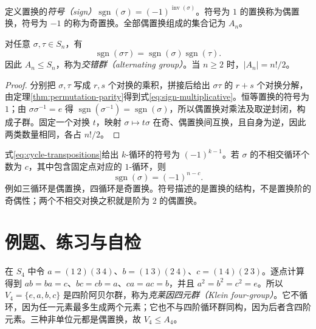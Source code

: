 \begin{definition}[符号与交错群]
定义置换的\emph{符号（sign）}$\operatorname{sgn}(\sigma)=(-1)^{\operatorname{inv}(\sigma)}$。符号为 $1$ 的置换称为偶置换，符号为 $-1$ 的称为奇置换。全部偶置换组成的集合记为 $A_n$。
\end{definition}

\begin{proposition}[符号的乘法性]\label{prop:sign-multiplicative}
对任意 $\sigma,\tau\in S_n$，有
\begin{equation}\label{eq:sign-multiplicative}
  \operatorname{sgn}(\sigma\tau)
  =\operatorname{sgn}(\sigma)\operatorname{sgn}(\tau).
\end{equation}
因此 $A_n\leq S_n$，称为\emph{交错群（alternating group）}。当 $n\geq2$ 时，$|A_n|=n!/2$。
\end{proposition}
\begin{proof}
分别把 $\sigma,\tau$ 写成 $r,s$ 个对换的乘积，拼接后给出 $\sigma\tau$ 的 $r+s$ 个对换分解，由定理\ref{thm:permutation-parity}得到式\eqref{eq:sign-multiplicative}。恒等置换的符号为 $1$；由 $\sigma\sigma^{-1}=e$ 得 $\operatorname{sgn}(\sigma^{-1})=\operatorname{sgn}(\sigma)$，所以偶置换对乘法及取逆封闭，构成子群。固定一个对换 $t$，映射 $\sigma\mapsto t\sigma$ 在奇、偶置换间互换，且自身为逆，因此两类数量相同，各占 $n!/2$。
\end{proof}

式\eqref{eq:cycle-transpositions}给出 $k$-循环的符号为 $(-1)^{k-1}$。若 $\sigma$ 的不相交循环个数为 $c$，其中包含固定点对应的 $1$-循环，则
\begin{equation}\label{eq:sign-cycle-count}
  \operatorname{sgn}(\sigma)=(-1)^{n-c}.
\end{equation}
例如三循环是偶置换，四循环是奇置换。符号描述的是置换的结构，不是置换阶的奇偶性；两个不相交对换之积就是阶为 $2$ 的偶置换。

\section{例题、练习与自检}

\begin{example}[阿贝尔群未必循环]\label{ex:klein-four}
在 $S_4$ 中令 $a=(1\ 2)(3\ 4)$、$b=(1\ 3)(2\ 4)$、$c=(1\ 4)(2\ 3)$。逐点计算得到 $ab=ba=c$、$bc=cb=a$、$ca=ac=b$，并且 $a^2=b^2=c^2=e$。所以 $V_4=\{e,a,b,c\}$ 是四阶阿贝尔群，称为\emph{克莱因四元群（Klein four-group）}。它不循环，因为任一元素最多生成两个元素；它也不与四阶循环群同构，因为后者含四阶元素。三种非单位元都是偶置换，故 $V_4\leq A_4$。
\end{example}


